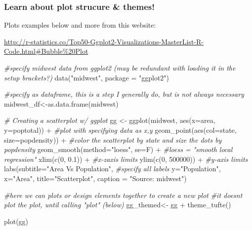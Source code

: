 \documentclass[
]{article}
\newenvironment{Shaded}{\begin{snugshade}}{\end{snugshade}}
\newcommand{\AttributeTok}[1]{\textcolor[rgb]{0.77,0.63,0.00}{#1}}
\newcommand{\CommentTok}[1]{\textcolor[rgb]{0.56,0.35,0.01}{\textit{#1}}}
\newcommand{\DecValTok}[1]{\textcolor[rgb]{0.00,0.00,0.81}{#1}}
\newcommand{\FloatTok}[1]{\textcolor[rgb]{0.00,0.00,0.81}{#1}}
\newcommand{\FunctionTok}[1]{\textcolor[rgb]{0.00,0.00,0.00}{#1}}
\newcommand{\NormalTok}[1]{#1}
\newcommand{\OtherTok}[1]{\textcolor[rgb]{0.56,0.35,0.01}{#1}}
\newcommand{\SpecialCharTok}[1]{\textcolor[rgb]{0.00,0.00,0.00}{#1}}
\newcommand{\StringTok}[1]{\textcolor[rgb]{0.31,0.60,0.02}{#1}}
\begin{document}
\hypertarget{learn-about-plot-strucure-themes}{%
\subsubsection{Learn about plot strucure \&
themes!}\label{learn-about-plot-strucure-themes}}

Plots examples below and more from this website:

\url{http://r-statistics.co/Top50-Ggplot2-Visualizations-MasterList-R-Code.html\#Bubble\%20Plot}

\begin{Shaded}
\begin{Highlighting}[]
\CommentTok{\#specify midwest data from ggplot2 (may be redundant with loading it in the setup brackets?)}
\FunctionTok{data}\NormalTok{(}\StringTok{"midwest"}\NormalTok{, }\AttributeTok{package =} \StringTok{"ggplot2"}\NormalTok{)}

\CommentTok{\#specify as dataframe, this is a step I generally do, but is not always necessary}
\NormalTok{midwest\_df}\OtherTok{\textless{}{-}}\FunctionTok{as.data.frame}\NormalTok{(midwest)}

\CommentTok{\# Creating a scatterplot w/ ggplot}
\NormalTok{gg }\OtherTok{\textless{}{-}} \FunctionTok{ggplot}\NormalTok{(midwest, }\FunctionTok{aes}\NormalTok{(}\AttributeTok{x=}\NormalTok{area, }\AttributeTok{y=}\NormalTok{poptotal)) }\SpecialCharTok{+} \CommentTok{\#plot with specifying data as x,y }
  \FunctionTok{geom\_point}\NormalTok{(}\FunctionTok{aes}\NormalTok{(}\AttributeTok{col=}\NormalTok{state, }\AttributeTok{size=}\NormalTok{popdensity)) }\SpecialCharTok{+} \CommentTok{\#color the scatterplot by state and size the dots by popdensity}
  \FunctionTok{geom\_smooth}\NormalTok{(}\AttributeTok{method=}\StringTok{"loess"}\NormalTok{, }\AttributeTok{se=}\NormalTok{F) }\SpecialCharTok{+} \CommentTok{\#loess = "smooth local regression"}
  \FunctionTok{xlim}\NormalTok{(}\FunctionTok{c}\NormalTok{(}\DecValTok{0}\NormalTok{, }\FloatTok{0.1}\NormalTok{)) }\SpecialCharTok{+} \CommentTok{\#x{-}zaxis limits}
  \FunctionTok{ylim}\NormalTok{(}\FunctionTok{c}\NormalTok{(}\DecValTok{0}\NormalTok{, }\DecValTok{500000}\NormalTok{)) }\SpecialCharTok{+} \CommentTok{\#y{-}axis limits}
  \FunctionTok{labs}\NormalTok{(}\AttributeTok{subtitle=}\StringTok{"Area Vs Population"}\NormalTok{,  }\CommentTok{\#specify all labels}
       \AttributeTok{y=}\StringTok{"Population"}\NormalTok{, }
       \AttributeTok{x=}\StringTok{"Area"}\NormalTok{, }
       \AttributeTok{title=}\StringTok{"Scatterplot"}\NormalTok{, }
       \AttributeTok{caption =} \StringTok{"Source: midwest"}\NormalTok{)}

\CommentTok{\#here we can plots or design elements together to create a new plot}
\CommentTok{\#it doesn\textquotesingle{}t plot the plot, until calling "plot" (below)}
\NormalTok{gg\_themed}\OtherTok{\textless{}{-}}\NormalTok{ gg }\SpecialCharTok{+}  \FunctionTok{theme\_tufte}\NormalTok{() }

\FunctionTok{plot}\NormalTok{(gg)}
\end{Highlighting}
\end{Shaded}
\end{document}
